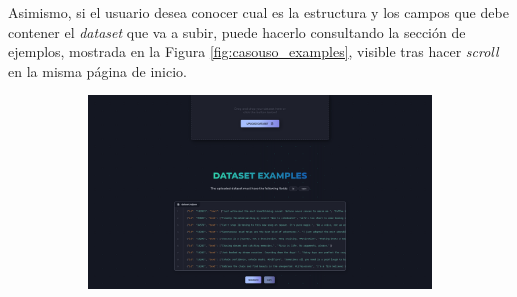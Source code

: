 \bigskip
Asimismo, si el usuario desea conocer cual es la estructura y los campos que debe contener el \textit{dataset} que va a subir,
puede hacerlo consultando la sección de ejemplos, mostrada en la Figura \ref{fig:casouso_examples}, visible tras hacer \textit{scroll}
en la misma página de inicio.

\bigskip
\begin{figure}[H]
	\centering
	\begin{subfigure}[c]{0.74\textwidth}
		\centering
		\includegraphics[width=\textwidth]{imagenes/examples.png}
		\label{fig:casouso_examples_escritorio}
	\end{subfigure}
	\hfill
	\begin{subfigure}[c]{0.21\textwidth}
		\centering

\end{subfigure}
\end{figure}
